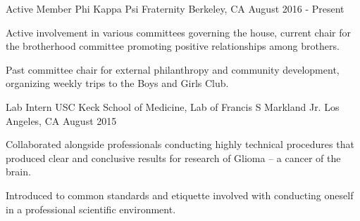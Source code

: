

\begin{cventries}

  \cventry
    {Active Member} %
    {Phi Kappa Psi Fraternity} %
    {Berkeley, CA} %
    {August 2016 - Present} %
    {
      \begin{cvitems} %
        \item {Active involvement in various committees governing the house, current chair for the brotherhood committee promoting positive relationships among brothers.}
        \item {Past committee chair for external philanthropy and community development, organizing weekly trips to the Boys and Girls Club.}
      \end{cvitems}
    }

  \cventry
    {Lab Intern} %
    {USC Keck School of Medicine, Lab of Francis S Markland Jr.} %
    {Los Angeles, CA} %
    {August 2015} %
    {
      \begin{cvitems} %
        \item {Collaborated alongside professionals conducting highly technical procedures that produced clear and conclusive results for research of Glioma – a cancer of the brain.}
        \item {Introduced to common standards and etiquette involved with conducting oneself in a professional scientific environment.}
      \end{cvitems}
    }

\end{cventries}
